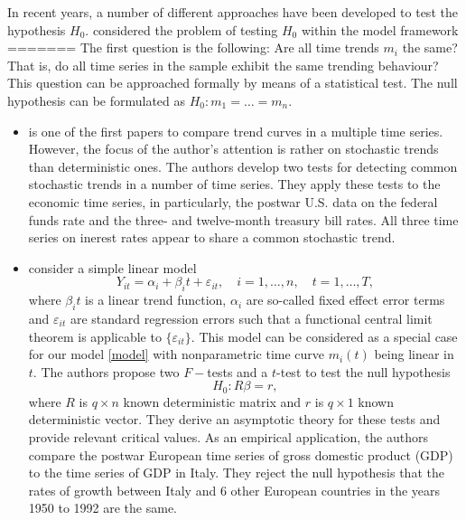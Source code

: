 \documentclass[a4paper,12pt]{article}
\begin{document}
In recent years, a number of different approaches have been developed to test the hypothesis $H_0$. \cite{DegrasWu2012} considered the problem of testing $H_0$ within the model framework
=======
\noindent The first question is the following: Are all time trends $m_i$ the same? That is, do all time series in the sample exhibit the same trending behaviour? This question can be approached formally by means of a statistical test. The null hypothesis can be formulated as $H_0: m_1 = \ldots = m_n$. 
\begin{itemize}[label=--,leftmargin=0.5cm]
\item \cite{Stock1988} is one of the first papers to compare trend curves in a multiple time series. However, the focus of the author's attention is rather on stochastic trends than deterministic ones. The authors develop two tests for detecting common stochastic trends in a number of time series. They apply these tests to the economic time series, in particularly, the postwar U.S. data on the federal funds rate and the three- and twelve-month treasury bill rates. All three time series on inerest rates appear to share a common stochastic trend.

\item \cite{Vogelsang2005} consider a simple linear model
\begin{equation}\label{model-vogelsang}
Y_{it} =\alpha_i + \beta_i t + \varepsilon_{it}, \quad i=1, \ldots, n, \quad t=1, \ldots, T,
\end{equation}
where $\beta_i t$ is a linear trend function, $\alpha_i$ are so-called fixed effect error terms and $\varepsilon_{it}$ are standard regression errors such that a functional central limit theorem is applicable to $\{\varepsilon_{it}\}$. This model can be considered as a special case for our model \eqref{model} with nonparametric time curve $m_i(t)$ being linear in $t$. The authors propose two $F-$tests and a $t$-test to test the null hypothesis 
\begin{equation}\label{hypothesis-vogelsang}
H_0: R\beta = r,
\end{equation}
where $R$ is $q \times n$ known deterministic matrix and $r$ is $q\times 1$ known deterministic vector. They derive an asymptotic theory for these tests and provide relevant critical values. As an empirical application, the authors compare the postwar European time series of gross domestic product (GDP) to the time series of GDP in Italy. They reject the null hypothesis that the rates of growth between Italy and 6 other European countries in the years 1950 to 1992 are the same.


\end{itemize}
\end{document}
